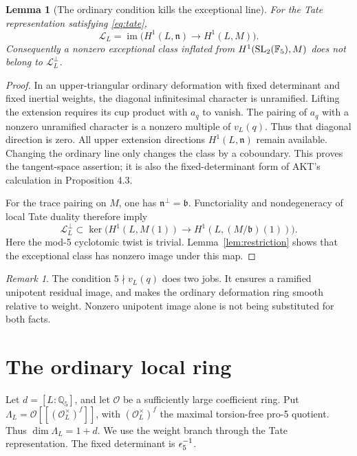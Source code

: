 \documentclass[11pt,a4paper]{article}
\newtheorem{lemma}[theorem]{Lemma}
\theoremstyle{definition}\newtheorem{definition}[theorem]{Definition}
\theoremstyle{remark}\newtheorem*{remark}{Remark}
\newcommand{\Q}{\mathbb Q}\newcommand{\Z}{\mathbb Z}
\newcommand{\F}{\mathbb F}\newcommand{\OO}{\mathcal O}
\newcommand{\im}{\operatorname{im}}\newcommand{\ur}{\mathrm{ur}}
\begin{document}
\begin{lemma}[The ordinary condition kills the exceptional line]
\label{lem:kill}
For the Tate representation satisfying \eqref{eq:tate},
\[
 \mathcal L_L=\im\bigl(H^1(L,\mathfrak n)\longrightarrow H^1(L,M)\bigr).
\]
Consequently a nonzero exceptional class inflated from
$H^1(\SL_2(\F_5),M)$ does not belong to $\mathcal L_L^\perp$.
\end{lemma}
\begin{proof}
In an upper-triangular ordinary deformation with fixed determinant and fixed
inertial weights, the diagonal infinitesimal character is unramified. Lifting
the extension requires its cup product with $a_q$ to vanish. The pairing of
$a_q$ with a nonzero unramified character is a nonzero multiple of $v_L(q)$.
Thus that diagonal direction is zero. All upper extension directions
$H^1(L,\mathfrak n)$ remain available. Changing the ordinary line only changes
the class by a coboundary. This proves the tangent-space assertion; it is also
the fixed-determinant form of AKT's calculation in Proposition 4.3.

For the trace pairing on $M$, one has $\mathfrak n^\perp=\mathfrak b$.
Functoriality and nondegeneracy of local Tate duality therefore imply
\[
 \mathcal L_L^\perp\subset
 \ker\bigl(H^1(L,M(1))\longrightarrow
                     H^1(L,(M/\mathfrak b)(1))\bigr).
\]
Here the mod-5 cyclotomic twist is trivial. Lemma~\ref{lem:restriction}
shows that the exceptional class has nonzero image under this map.
\end{proof}

\begin{remark}
The condition $5\nmid v_L(q)$ does two jobs. It ensures a ramified unipotent
residual image, and makes the ordinary deformation ring smooth relative to
weight. Nonzero unipotent image alone is not being substituted for both facts.
\end{remark}

\section{The ordinary local ring}
\label{sec:ring}

Let $d=[L:\Q_5]$, and let $\OO$ be a sufficiently large coefficient ring.
Put $\Lambda_L=\OO[[(\OO_L^\times)^f]]$, with $(\OO_L^\times)^f$ the maximal
torsion-free pro-5 quotient. Thus $\dim\Lambda_L=1+d$. We use the weight branch
through the Tate representation. The fixed determinant is $\epsilon_5^{-1}$.
\end{document}
